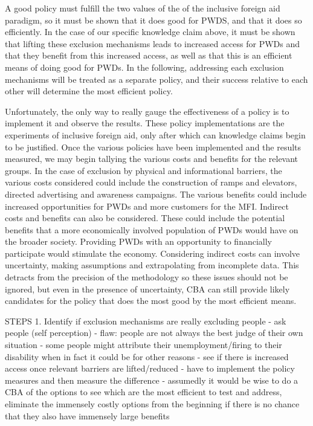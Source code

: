 \documentclass[a4paper]{article}
\begin{document}
A good policy must fulfill the two values of the of the inclusive foreign aid
paradigm, so it must be shown that it does good for PWDS, and that it does so
efficiently. In the case of our specific knowledge claim above, it must be
shown that lifting these exclusion mechanisms leads to increased access for
PWDs and that they benefit from this increased access, as well as that this is
an efficient means of doing good for PWDs. In the following, addressing each
exclusion mechanisms will be treated as a separate policy, and their success
relative to each other will determine the most efficient policy.

Unfortunately, the only way to really gauge the effectiveness of a policy is
to implement it and observe the results. These policy implementations are the
experiments of inclusive foreign aid, only after which can knowledge claims
begin to be justified. Once the various policies have been implemented and
the results measured, we may begin tallying the various costs and benefits for
the relevant groups. In the case of exclusion by physical and informational
barriers, the various costs considered could include the construction of ramps
and elevators, directed advertising and awareness campaigns. The various
benefits could include increased opportunities for PWDs and more customers for
the MFI. Indirect costs and benefits can also be considered. These could
include the potential benefits that a more economically involved population of
PWDs would have on the broader society. Providing PWDs with an opportunity to
financially participate would stimulate the economy. Considering indirect
costs can involve uncertainty, making assumptions and extrapolating from
incomplete data. This detracts from the precision of the methodology so these
issues should not be ignored, but even in the presence of uncertainty, CBA can
still provide likely candidates for the policy that does the most good by the
most efficient means.





STEPS
1. Identify if exclusion mechanisms are really excluding people
    - ask people (self perception)
        - flaw: people are not always the best judge of their own situation
            - some people might attribute their unemployment/firing to their
            disability when in fact it could be for other reasons
    - see if there is increased access once relevant barriers are
      lifted/reduced
        - have to implement the policy measures and then measure the
          difference
        - assumedly it would be wise to do a CBA of the options to see which
        are the most efficient to test and address, eliminate the immensely
        costly options from the beginning if there is no chance that they also
        have immensely large benefits
\end{document}
